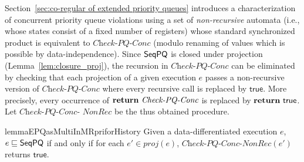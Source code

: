 Section~\ref{sec:co-regular of extended priority queues} introduces a characterization of concurrent priority queue violations using a set of \emph{non-recursive} automata (i.e., whose states consist of a fixed number of registers) whose standard synchronized product is equivalent to $\textit{Check-PQ-Conc}$ (modulo renaming of values which is possible by data-independence). Since $\mathsf{SeqPQ}$ is closed under projection (Lemma~\ref{lem:closure_proj}), the recursion in $\textit{Check-PQ-Conc}$ can be eliminated by checking that each projection of a given execution $e$ passes a non-recursive version of $\textit{Check-PQ-Conc}$ where every recursive call is replaced by $\mathsf{true}$. More precisely, every occurrence of $\text{{\bf return}}\ \textit{Check-PQ-Conc}$ is replaced by  $\text{{\bf return}}\ \mathsf{true}$. Let $\textit{Check-PQ-Conc-}$ $\textit{NonRec}$ be the thus obtained procedure.

\begin{restatable}{lemma}{EPQasMultiInMRpriforHistory}
\label{lemma:EPQ as multi in MRpri for history}
Given a data-differentiated execution $e$, $e \sqsubseteq \mathsf{SeqPQ}$ if and only if for each $e' \in \textit{proj}(e)$, $\textit{Check-PQ-Conc-NonRec}(e')$ returns $\mathsf{true}$.
\end{restatable}






